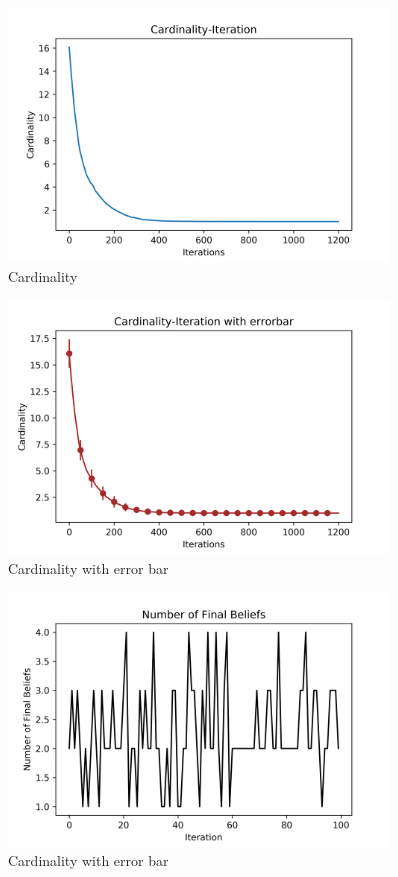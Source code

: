 \documentclass[a4paper,12pt]{article}
\begin{document}
    \begin{figure}[H]
    	\centering
    	\includegraphics[width=0.9\textwidth]{Card50_5_1200_1000_5}
    	\caption{Cardinality}\label{Card50_5_1200_1000.5_h}
    \end{figure}
    \begin{figure}[H]
    	\centering
    	\includegraphics[width=0.9\textwidth]{CardErr50_5_1200_1000_5}
    	\caption{Cardinality with error bar}\label{CardErr50_5_1200_1000.5_h}
    \end{figure}
    \begin{figure}[H]
    	\centering
    	\includegraphics[width=0.9\textwidth]{numbef50_5_1200_1000_5}
    	\caption{Cardinality with error bar}\label{numbef50_5_1200_1000.5}
    \end{figure}
\end{document}
